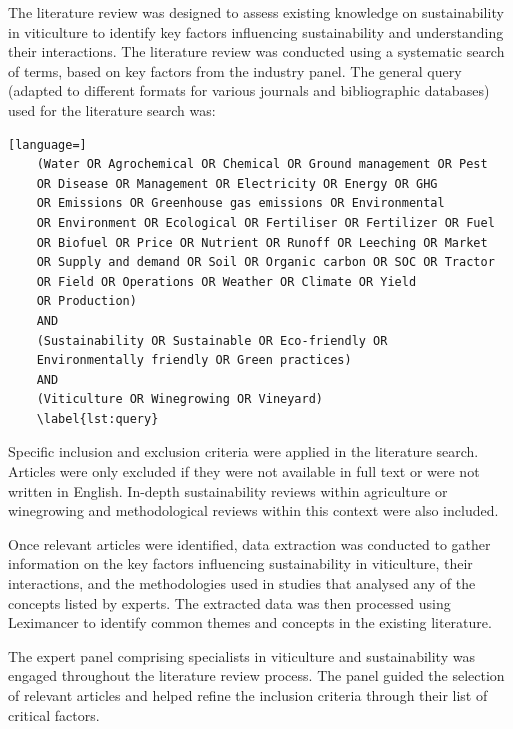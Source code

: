 \documentclass[10pt,letterpaper]{article}
\begin{document}
The literature review was designed to assess existing knowledge on sustainability in viticulture to identify key factors influencing sustainability and understanding their interactions. The literature review was conducted using a systematic search of terms, based on key factors from the industry panel. The general query (adapted to different formats for various journals and bibliographic databases) used for the literature search was: 

\begin{lstlisting}[language=]
    (Water OR Agrochemical OR Chemical OR Ground management OR Pest
    OR Disease OR Management OR Electricity OR Energy OR GHG
    OR Emissions OR Greenhouse gas emissions OR Environmental
    OR Environment OR Ecological OR Fertiliser OR Fertilizer OR Fuel
    OR Biofuel OR Price OR Nutrient OR Runoff OR Leeching OR Market
    OR Supply and demand OR Soil OR Organic carbon OR SOC OR Tractor
    OR Field OR Operations OR Weather OR Climate OR Yield
    OR Production)
    AND
    (Sustainability OR Sustainable OR Eco-friendly OR
    Environmentally friendly OR Green practices)
    AND
    (Viticulture OR Winegrowing OR Vineyard)
    \label{lst:query}
\end{lstlisting}

Specific inclusion and exclusion criteria were applied in the literature search. Articles were only excluded if they were not available in full text or were not written in English. In-depth sustainability reviews within agriculture or winegrowing and methodological reviews within this context were also included.

Once relevant articles were identified, data extraction was conducted to gather information on the key factors influencing sustainability in viticulture, their interactions, and the methodologies used in studies that analysed any of the concepts listed by experts. The extracted data was then processed using Leximancer to identify common themes and concepts in the existing literature.

The expert panel comprising specialists in viticulture and sustainability was engaged throughout the literature review process. The panel guided the selection of relevant articles and helped refine the inclusion criteria through their list of critical factors.
\end{document}
